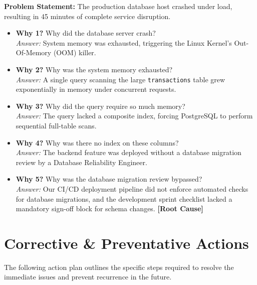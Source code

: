 \documentclass[11pt,a4paper]{article}
\begin{document}
\begin{tcolorbox}[colback=LightNeutral, colframe=PrimaryColor, arc=4pt, title=\textbf{5-Whys Analysis}, fonttitle=\large\bfseries, boxrule=1.5pt]
  \textbf{Problem Statement:} The production database host crashed under load, resulting in 45 minutes of complete service disruption.
  
  \vspace{0.2cm}
  \begin{itemize}[label=\textcolor{AccentColor}{\small\faArrowRight}, leftmargin=15pt, itemsep=4pt]
    \item \textbf{Why 1? } Why did the database server crash? \\
      \textit{Answer: } System memory was exhausted, triggering the Linux Kernel's Out-Of-Memory (OOM) killer.
    \item \textbf{Why 2? } Why was the system memory exhausted? \\
      \textit{Answer: } A single query scanning the large \texttt{transactions} table grew exponentially in memory under concurrent requests.
    \item \textbf{Why 3? } Why did the query require so much memory? \\
      \textit{Answer: } The query lacked a composite index, forcing PostgreSQL to perform sequential full-table scans.
    \item \textbf{Why 4? } Why was there no index on these columns? \\
      \textit{Answer: } The backend feature was deployed without a database migration review by a Database Reliability Engineer.
    \item \textbf{Why 5? } Why was the database migration review bypassed? \\
      \textit{Answer: } Our CI/CD deployment pipeline did not enforce automated checks for database migrations, and the development sprint checklist lacked a mandatory sign-off block for schema changes. \textbf{[Root Cause]}
  \end{itemize}
\end{tcolorbox}

\vspace{0.4cm}

\section{Corrective \& Preventative Actions}
The following action plan outlines the specific steps required to resolve the immediate issues and prevent recurrence in the future.
\end{document}
